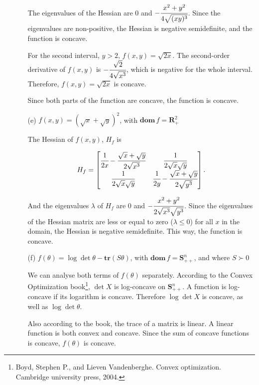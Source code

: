 \documentclass[11pt,a4paper]{article}
\begin{document}
\begin{itemize}
\begin{itemize}
        The eigenvalues of the Hessian are $0$ and $-\cfrac{x^2 + y^2}{4\sqrt{(xy)^3}}$. Since the eigenvalues are non-positive, the Hessian is negative semidefinite, and the function is concave. 

        For the second interval, $y > 2$, $f(x, y) = \sqrt{2x}$. The second-order derivative of $f(x,y)$ is $-\cfrac{\sqrt{2}}{4\sqrt{x^3}}$, which is negative for the whole interval. Therefore, $f(x,y) = \sqrt{2x}$ is concave. 

        Since both parts of the function are concave, the function is concave. 

        \item[(e)] $f(x,y) = (\sqrt{x} + \sqrt{y})^2$, with $\textbf{dom} \, f = \mathbf{R}_+^2$
        
        The Hessian of $f(x, y)$, $H_f$ is

        \begin{equation*}
            H_f = \begin{bmatrix}
                \cfrac{1}{2x} - \cfrac{\sqrt{x} + \sqrt{y}}{2\sqrt{x^3}} & \cfrac{1}{2\sqrt{x}\sqrt{y}} \\
                \cfrac{1}{2\sqrt{x}\sqrt{y}} & \cfrac{1}{2y} - \cfrac{\sqrt{x} + \sqrt{y}}{2\sqrt{y^3}}
            \end{bmatrix}.
        \end{equation*}

        And the eigenvalues $\lambda$ of $H_f$ are 0 and $-\cfrac{x^2 + y^2}{2\sqrt{x^3}\sqrt{y^3}}$. Since the eigenvalues of the Hessian matrix are less or equal to zero ($\lambda \leq 0$) for all $x$ in the domain, the Hessian is negative semidefinite. This way, the function is concave. 

        \item[(f)] $f(\theta) = \log \det \theta - \textbf{tr}(S\theta)$, with $\textbf{dom} \, f = \mathbf{S}_{++}^n$, and where $S \succ 0$
        
        We can analyse both terms of $f(\theta)$ separately. According to the Convex Optimization book\footnote{Boyd, Stephen P., and Lieven Vandenberghe. Convex optimization. Cambridge university press, 2004.}, $\det X$ is log-concave on $\mathbf{S}_{++}^n$. A function is log-concave if its logarithm is concave. Therefore $\log \det X$ is concave, as well as $\log \det \theta$. 

        Also according to the book, the trace of a matrix is linear. A linear function is both convex and concave. Since the sum of concave functions is concave, $f(\theta)$ is concave. 
    \end{itemize}


\end{itemize}
\end{document}
